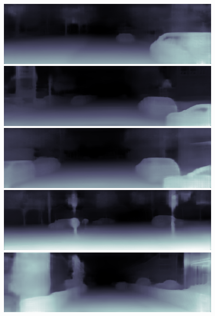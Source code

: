 \documentclass{svjour3}                     %
\begin{document}
\begin{figure}[t]
{\begin{minipage}[b]{0.15\linewidth}
  \includegraphics[width=1\linewidth]{images/kitti_without/2011_09_26_drive_0013_sync_0000000035.png}\vspace{5pt}
  \includegraphics[width=1\linewidth]{images/kitti_without/2011_09_26_drive_0009_sync_0000000260.png}\vspace{5pt}
  \includegraphics[width=1\linewidth]{images/kitti_without/2011_09_26_drive_0009_sync_0000000340.png}\vspace{5pt}
  \includegraphics[width=1\linewidth]{images/kitti_without/2011_09_26_drive_0009_sync_0000000388.png}\vspace{5pt}
  \includegraphics[width=1\linewidth]{images/kitti_without/2011_09_30_drive_0018_sync_0000000642.png}

\end{minipage}}
\end{figure}
\end{document}
